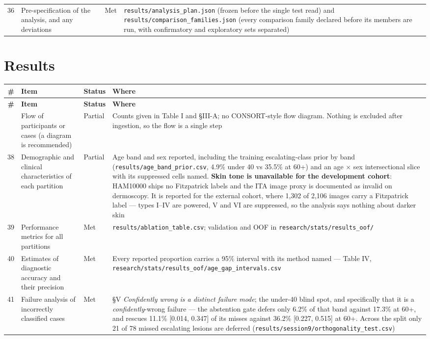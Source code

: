 \documentclass[10pt,a4paper]{article}
\begin{document}
\begin{longtable}{@{}rp{}lp{}@{}}
36 & Pre-specification of the analysis, and any deviations & Met & \texttt{results/analysis\_plan.json} (frozen before the single test read) and \texttt{results/comparison\_families.json} (every comparison family declared before its members are run, with confirmatory and exploratory sets separated) \\
\end{longtable}


\section*{Results}


\begin{longtable}{@{}rp{}lp{}@{}}
\toprule
\textbf{\#} & \textbf{Item} & \textbf{Status} & \textbf{Where} \\
\midrule
\endfirsthead
\toprule
\textbf{\#} & \textbf{Item} & \textbf{Status} & \textbf{Where} \\
\midrule
\endhead
\bottomrule
\endfoot
37 & Flow of participants or cases (a diagram is recommended) & Partial & Counts given in Table I and \S{}III-A; no CONSORT-style flow diagram. Nothing is excluded after ingestion, so the flow is a single step \\
38 & Demographic and clinical characteristics of each partition & Partial & Age band and sex reported, including the training escalating-class prior by band (\texttt{results/age\_band\_prior.csv}, 4.9\% under 40 vs 35.5\% at 60+) and an age $\times$ sex intersectional slice with its suppressed cells named. \textbf{Skin tone is unavailable for the development cohort}: HAM10000 ships no Fitzpatrick labels and the ITA image proxy is documented as invalid on dermoscopy. It is reported for the external cohort, where 1,302 of 2,106 images carry a Fitzpatrick label --- types I--IV are powered, V and VI are suppressed, so the analysis says nothing about darker skin \\
39 & Performance metrics for all partitions & Met & \texttt{results/ablation\_table.csv}; validation and OOF in \texttt{research/stats/results\_oof/} \\
40 & Estimates of diagnostic accuracy and their precision & Met & Every reported proportion carries a 95\% interval with its method named --- Table IV, \texttt{research/stats/results\_oof/age\_gap\_intervals.csv} \\
41 & Failure analysis of incorrectly classified cases & Met & \S{}V \emph{Confidently wrong is a distinct failure mode}; the under-40 blind spot, and specifically that it is a \emph{confidently}-wrong failure --- the abstention gate defers only 6.2\% of that band against 17.3\% at 60+, and rescues 11.1\% [0.014, 0.347] of its misses against 36.2\% [0.227, 0.515] at 60+. Across the split only 21 of 78 missed escalating lesions are deferred (\texttt{results/session9/orthogonality\_test.csv}) \\
\end{longtable}
\end{document}
